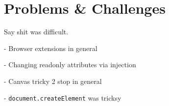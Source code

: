 \chapter{Problems \& Challenges}

Say shit was difficult.

- Browser extensions in general

- Changing readonly attributes via injection

- Canvas tricky 2 stop in general

- \texttt{document.createElement} was tricksy
